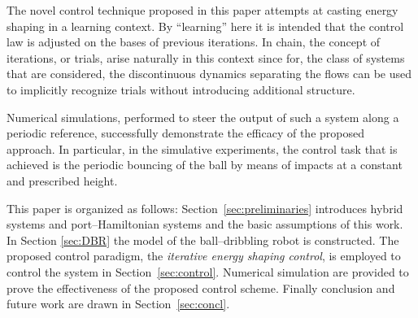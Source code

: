 {The novel control technique proposed in this paper attempts at casting energy shaping in a learning context. By ``learning'' here it is intended that the control law is adjusted on the bases of previous iterations. In chain, the concept of iterations, or trials, arise naturally in this context since for, the class of systems that are considered, the discontinuous dynamics separating the flows can be used to implicitly recognize trials without introducing additional structure.

Numerical simulations, performed to steer the output of such a system along a periodic reference, successfully demonstrate the efficacy of the proposed approach. In particular, in the simulative experiments, the control task that is achieved is the periodic bouncing of the ball by means of impacts at a constant and prescribed height.

This paper is organized as follows: Section~\ref{sec:preliminaries} introduces hybrid systems and port--Hamiltonian systems and the basic assumptions of this work.
In Section \ref{sec:DBR} the model of the ball--dribbling robot is constructed. The proposed control paradigm, the \textit{iterative energy shaping control}, is employed to control the system in Section~\ref{sec:control}. Numerical simulation are provided to prove the effectiveness of the proposed control scheme.
Finally conclusion and future work are drawn in Section~\ref{sec:concl}.}
